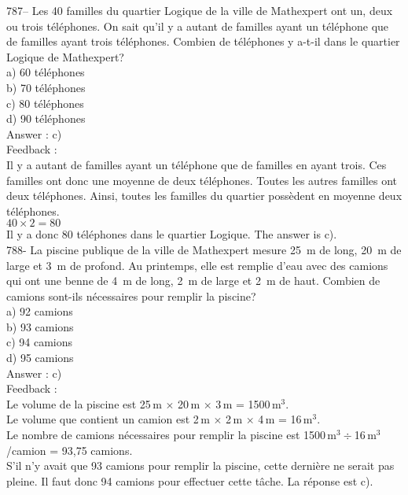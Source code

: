 ﻿\documentclass[letterpaper, 12pt]{article}
\begin{document}
787-- Les 40 familles du quartier Logique de la ville de Mathexpert ont un,
deux ou trois t\'el\'ephones.  On sait qu'il y a autant de familles ayant un
t\'el\'ephone que de familles ayant trois t\'el\'ephones.  Combien de
t\'el\'ephones y a-t-il dans le quartier Logique de Mathexpert?\\
a) 60 t\'el\'ephones\\
b) 70 t\'el\'ephones\\
c) 80 t\'el\'ephones\\
d) 90 t\'el\'ephones\\

Answer : c)\\

Feedback : \\
Il y a autant de familles ayant un t\'el\'ephone que de familles en ayant
trois.  Ces familles ont donc une moyenne de deux t\'el\'ephones.  Toutes
les autres familles ont deux t\'el\'ephones.  Ainsi, toutes les familles du
quartier poss\`edent en moyenne deux t\'el\'ephones.  \\
$40\times2=80$\\
Il y a donc 80 t\'el\'ephones dans le quartier Logique.  The answer is
c).\\

788- La piscine publique de la ville de Mathexpert mesure 25~m de long, 20~m
de large et 3~m de profond.  Au printemps, elle est remplie d'eau avec des
camions qui ont une benne de 4~m de long, 2~m de large et 2~m de haut.
Combien de camions sont-ils n\'ecessaires pour remplir la piscine?\\
a) 92 camions\\
b) 93 camions\\
c) 94 camions\\
d) 95 camions\\

Answer : c)\\

Feedback : \\
Le volume de la piscine est 25\,m $\times$ 20\,m $\times$ 3\,m =
1500\,m$^{3}$.\\
Le volume que contient un camion est 2\,m $\times$ 2\,m $\times$ 4\,m =
16\,m$^{3}$.\\
Le nombre de camions n\'ecessaires pour remplir la piscine est
1500\,m$^{3}\div$16\,m$^{3}$/camion = 93,75 camions.\\
S'il n'y avait que 93 camions pour remplir la piscine, cette derni\`ere ne
serait pas pleine. Il faut donc 94 camions pour effectuer cette t\^ache. La
r\'eponse est c).\\
\end{document}
